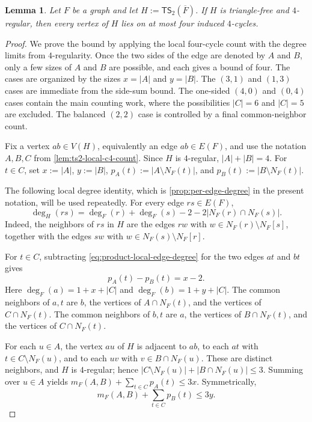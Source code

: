 \documentclass[a4paper]{article}
\theoremstyle{plain}
\newtheorem{lemma}[lemma]{Lemma}
\theoremstyle{definition}
\newcommand{\TSsym}{\mathsf{TS}}
\numberwithin{equation}{section}
\begin{document}
\begin{lemma}
\label{lem:ts2-four-regular-c4-cap}
Let $F$ be a graph and let $H:=\TSsym_2(\overline{F})$.
If $H$ is triangle-free and $4$-regular, then every vertex of $H$ lies on at most four induced $4$-cycles.
\end{lemma}

\begin{proof}
We prove the bound by applying the local four-cycle count with the degree limits from $4$-regularity.
Once the two sides of the edge are denoted by $A$ and $B$, only a few sizes of $A$ and $B$ are possible, and each gives a bound of four.
The cases are organized by the sizes $x=|A|$ and $y=|B|$.
The $(3,1)$ and $(1,3)$ cases are immediate from the side-sum bound.
The one-sided $(4,0)$ and $(0,4)$ cases contain the main counting work, where the possibilities $|C|=6$ and $|C|=5$ are excluded.
The balanced $(2,2)$ case is controlled by a final common-neighbor count.

Fix a vertex $ab\in V(H)$, equivalently an edge $ab\in E(F)$, and use the notation $A,B,C$ from \cref{lem:ts2-local-c4-count}.
Since $H$ is $4$-regular, $|A|+|B|=4$.
For $t\in C$, set $x:=|A|$, $y:=|B|$, $p_A(t):=|A\setminus N_F(t)|$, and $p_B(t):=|B\setminus N_F(t)|$.

The following local degree identity, which is \cref{prop:per-edge-degree} in the present notation, will be used repeatedly.
For every edge $rs\in E(F)$,
\begin{equation}
\label{eq:product-local-edge-degree}
\deg_H(rs)=\deg_F(r)+\deg_F(s)-2-2|N_F(r)\cap N_F(s)|.
\end{equation}
Indeed, the neighbors of $rs$ in $H$ are the edges $rw$ with $w\in N_F(r)\setminus N_F[s]$, together with the edges $sw$ with $w\in N_F(s)\setminus N_F[r]$.

For $t\in C$, subtracting \eqref{eq:product-local-edge-degree} for the two edges $at$ and $bt$ gives
\begin{equation}
\label{eq:product-pa-pb}
p_A(t)-p_B(t)=x-2.
\end{equation}
Here $\deg_F(a)=1+x+|C|$ and $\deg_F(b)=1+y+|C|$.
The common neighbors of $a,t$ are $b$, the vertices of $A\cap N_F(t)$, and the vertices of $C\cap N_F(t)$.
The common neighbors of $b,t$ are $a$, the vertices of $B\cap N_F(t)$, and the vertices of $C\cap N_F(t)$.

For each $u\in A$, the vertex $au$ of $H$ is adjacent to $ab$, to each $at$ with $t\in C\setminus N_F(u)$, and to each $uv$ with $v\in B\cap N_F(u)$.
These are distinct neighbors, and $H$ is $4$-regular; hence $|C\setminus N_F(u)|+|B\cap N_F(u)|\le 3$.
Summing over $u\in A$ yields $\displaystyle m_F(A,B)+\sum_{t\in C}p_A(t)\le 3x$.
Symmetrically,
\begin{equation}
\label{eq:product-b-side-sum}
m_F(A,B)+\sum_{t\in C}p_B(t)\le 3y.
\end{equation}


\end{proof}
\end{document}

